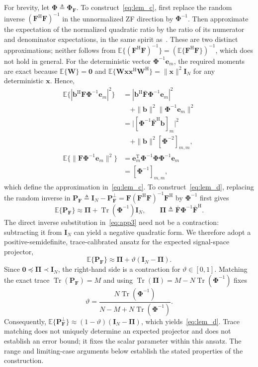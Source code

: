 \documentclass[journal]{IEEEtran}
\newcommand{\E}{\mathbb{E}}
\newcommand{\tr}{\operatorname{Tr}}
\newcommand{\bI}{\mathbf{I}}
\newcommand{\be}{\mathbf{e}}
\newcommand{\bb}{\mathbf{b}}
\newcommand{\bF}{\mathbf{F}}
\newcommand{\Fb}{\bar{\mathbf{F}}}
\newcommand{\bW}{\mathbf{W}}
\newcommand{\bPhi}{\boldsymbol{\Phi}}
\newcommand{\bPi}{\boldsymbol{\Pi}}
\begin{document}
\begin{IEEEproof}
For brevity, let $\bPhi\triangleq\bPhi_{\bF}$. To construct~\eqref{eq:lem_c}, first replace the random inverse $(\bF^{\mathrm{H}}\bF)^{-1}$ in the unnormalized ZF direction by $\bPhi^{-1}$. Then approximate the expectation of the normalized quadratic ratio by the ratio of its numerator and denominator expectations, in the same spirit as~\cite[Lemma~1]{ZhangJSTSP2014}. These are two distinct approximations; neither follows from $\E\{(\bF^{\mathrm{H}}\bF)^{-1}\}=(\E\{\bF^{\mathrm{H}}\bF\})^{-1}$, which does not hold in general. For the deterministic vector $\bPhi^{-1}\be_m$, the required moments are exact because $\E\{\bW\}=\mathbf 0$ and $\E\{\bW\mathbf x\mathbf x^{\mathrm{H}}\bW^{\mathrm{H}}\}=\|\mathbf x\|^2\bI_N$ for any deterministic $\mathbf x$. Hence,
\begin{align}
\E\{|\bb^{\mathrm{H}}\bF\bPhi^{-1}\be_m|^2\}
&=|\bb^{\mathrm{H}}\Fb\bPhi^{-1}\be_m|^2
\nonumber\\
&\quad+\|\bb\|^2\|\bPhi^{-1}\be_m\|^2
\nonumber\\
&=\big|[\bPhi^{-1}\Fb^{\mathrm{H}}\bb]_m\big|^2
\nonumber\\
&\quad+\|\bb\|^2[\bPhi^{-2}]_{m,m},
\label{eq:app1}\\
\E\{\|\bF\bPhi^{-1}\be_m\|^2\}
&=\be_m^{\mathrm{T}}\bPhi^{-1}\bPhi\bPhi^{-1}\be_m
\nonumber\\
&=[\bPhi^{-1}]_{m,m},
\label{eq:app2}
\end{align}
which define the approximation in~\eqref{eq:lem_c}. To construct~\eqref{eq:lem_d}, replacing the random inverse in $\mathbf P_{\bF}\triangleq\bI_N-\mathbf P_{\bF}^{\perp}=\bF(\bF^{\mathrm{H}}\bF)^{-1}\bF^{\mathrm{H}}$ by $\bPhi^{-1}$ first gives
\begin{equation}\label{eq:app3}
\E\{\mathbf P_{\bF}\}\approx\bPi+\tr(\bPhi^{-1})\bI_N,\qquad\bPi\triangleq\Fb\bPhi^{-1}\Fb^{\mathrm{H}}.
\end{equation}
The direct inverse substitution in~\eqref{eq:app3} need not be a contraction: subtracting it from $\bI_N$ can yield a negative quadratic form. We therefore adopt a positive-semidefinite, trace-calibrated ansatz for the expected signal-space projector,
\begin{equation}\label{eq:app4}
\E\{\mathbf P_{\bF}\}
\approx\bPi+\vartheta(\bI_N-\bPi).
\end{equation}
Since $\mathbf 0\preceq\bPi\prec\bI_N$, the right-hand side is a contraction for $\vartheta\in[0,1]$. Matching the exact trace $\tr(\mathbf P_{\bF})=M$ and using $\tr(\bPi)=M-N\tr(\bPhi^{-1})$ fixes
\begin{equation*}
\vartheta=\frac{N\tr(\bPhi^{-1})}
{N-M+N\tr(\bPhi^{-1})}.
\end{equation*}
Consequently, $\E\{\mathbf P_{\bF}^{\perp}\}\approx(1-\vartheta)(\bI_N-\bPi)$, which yields~\eqref{eq:lem_d}. Trace matching does not uniquely determine an expected projector and does not establish an error bound; it fixes the scalar parameter within this ansatz. The range and limiting-case arguments below establish the stated properties of the construction.


\end{IEEEproof}
\end{document}
